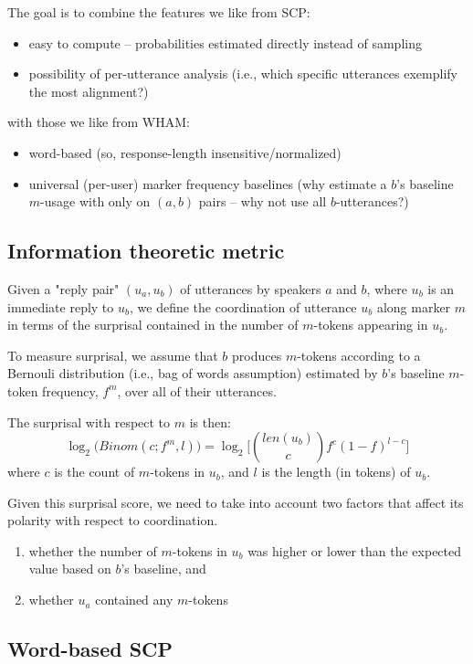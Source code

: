\documentclass[12pt]{scrartcl}
\begin{document}
The goal is to combine the features we like from SCP:
\begin{itemize}
	\item easy to compute -- probabilities estimated directly instead of sampling
  \item possibility of per-utterance analysis (i.e., which specific utterances exemplify the most alignment?)
\end{itemize}
with those we like from WHAM:
\begin{itemize}
	\item word-based (so, response-length insensitive/normalized)
  \item universal (per-user) marker frequency baselines (why estimate a $b$'s baseline $m$-usage with only on $(a,b)$ pairs -- why not use all $b$-utterances?)
\end{itemize}

\subsection{Information theoretic metric}

Given a "reply pair" $(u_a, u_b)$ of utterances by speakers $a$ and $b$, where $u_b$ is an immediate reply to $u_b$, we define the coordination of utterance $u_b$ along marker $m$ in terms of the surprisal contained in the number of $m$-tokens appearing in $u_b$.

To measure surprisal, we assume that $b$ produces $m$-tokens according to a Bernouli distribution (i.e., bag of words assumption) estimated by $b$'s baseline $m$-token frequency, $f^m$, over all of their utterances.

The surprisal with respect to $m$ is then:
\[
	\log_2\big(Binom(c;f^m,l)\big) = \log_2\Big[\binom{len(u_b)}{c} f^{c}(1-f)^{l-c}\Big]
\]
where $c$ is the count of $m$-tokens in $u_b$, and $l$ is the length (in tokens) of $u_b$.

Given this surprisal score, we need to take into account two factors that affect its polarity with respect to coordination.
\begin{enumerate}
	\item whether the number of $m$-tokens in $u_b$ was higher or lower than the expected value based on $b$'s baseline, and
	\item whether $u_a$ contained any $m$-tokens
\end{enumerate}

\subsection{Word-based SCP}
\end{document}
